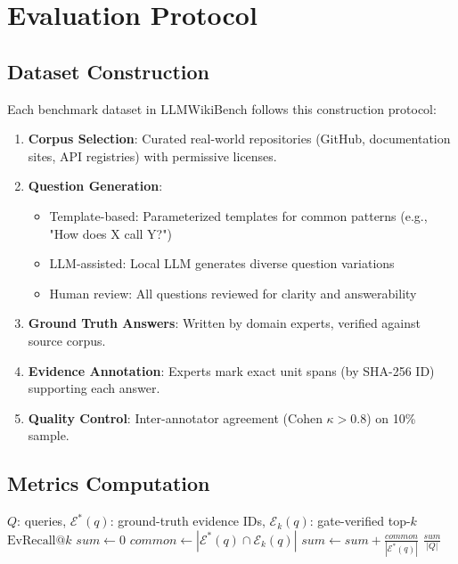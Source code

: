 
\section{Evaluation Protocol}
\label{app:eval-protocol}

\subsection{Dataset Construction}
\label{app:eval-dataset}

Each benchmark dataset in LLMWikiBench follows this construction protocol:

\begin{enumerate}
  \item \textbf{Corpus Selection}: Curated real-world repositories (GitHub, documentation sites, API registries) with permissive licenses.
  \item \textbf{Question Generation}:
    \begin{itemize}
      \item Template-based: Parameterized templates for common patterns (e.g., "How does X call Y?")
      \item LLM-assisted: Local LLM generates diverse question variations
      \item Human review: All questions reviewed for clarity and answerability
    \end{itemize}
  \item \textbf{Ground Truth Answers}: Written by domain experts, verified against source corpus.
  \item \textbf{Evidence Annotation}: Experts mark exact unit spans (by SHA-256 ID) supporting each answer.
  \item \textbf{Quality Control}: Inter-annotator agreement (Cohen $\kappa > 0.8$) on 10\% sample.
\end{enumerate}

\subsection{Metrics Computation}
\label{app:eval-metrics}

\begin{algorithm}[H]
\caption{Evidence Recall@k}
\label{alg:ev-recall}
\begin{algorithmic}[1]
\Require $Q$: queries, $\mathcal{E}^*(q)$: ground-truth evidence IDs, $\mathcal{E}_k(q)$: gate-verified top-$k$
\Ensure $\text{EvRecall}@k$
\State $sum \gets 0$
  \State $common \gets |\mathcal{E}^*(q) \cap \mathcal{E}_k(q)|$
  \State $sum \gets sum + \frac{common}{|\mathcal{E}^*(q)|}$
\EndFor
\State \Return $\frac{sum}{|Q|}$
\end{algorithmic}
\end{algorithm}

